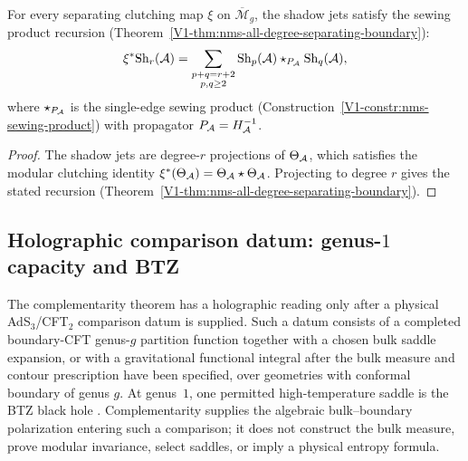 \begin{proposition}
For every separating clutching map $\xi$ on
$\overline{\mathcal{M}}_g$, the shadow jets satisfy the
sewing product recursion
\textup{(}Theorem~\textup{\ref{V1-thm:nms-all-degree-separating-boundary})}:
\begin{equation}%
\xi^* \Sh_r(\cA)
=
\sum_{\substack{p + q = r + 2 \\ p, q \ge 2}}
\Sh_p(\cA) \star_{P_\cA} \Sh_q(\cA),
\end{equation}
where $\star_{P_{\mathcal{A}}}$ is the single-edge sewing product
\textup{(}Construction~\textup{\ref{V1-constr:nms-sewing-product})}
with propagator $P_{\mathcal{A}} = H_{\mathcal{A}}^{-1}$.
\end{proposition}

\begin{proof}
The shadow jets are degree-$r$ projections of $\Theta_{\mathcal{A}}$,
which satisfies the modular clutching identity
$\xi^*(\Theta_{\mathcal{A}}) = \Theta_{\mathcal{A}} \star \Theta_{\mathcal{A}}$.
Projecting to degree $r$ gives the stated recursion
(Theorem~\ref{V1-thm:nms-all-degree-separating-boundary}).
\end{proof}

%
%

\subsection{Holographic comparison datum: genus-$1$ capacity and BTZ}
\label{subsec:thqg-III-holographic-entanglement}

The complementarity theorem has a holographic reading only after a
physical AdS$_3$/CFT$_2$ comparison datum is supplied. Such a datum
consists of a completed boundary-CFT genus-$g$ partition function
together with a chosen bulk saddle expansion, or with a gravitational
functional integral after the bulk measure and contour prescription
have been specified, over geometries with conformal boundary of genus
$g$. At genus~$1$, one permitted high-temperature saddle is the BTZ
black hole \cite{BTZ92}. Complementarity supplies the algebraic
bulk--boundary polarization entering such a comparison; it does not
construct the bulk measure, prove modular invariance, select saddles,
or imply a physical entropy formula.

